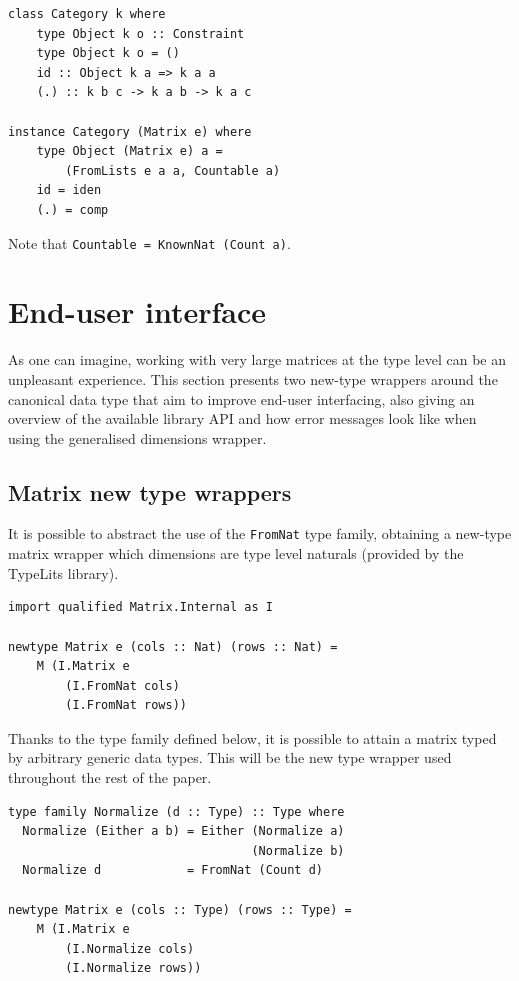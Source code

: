 \documentclass[sigplan]{acmart}\settopmatter{}
\newcommand{\hs}{\texttt}
\def\doc{paper}
\begin{document}
\vspace{1mm}
\begin{verbatim}
class Category k where
    type Object k o :: Constraint
    type Object k o = ()
    id :: Object k a => k a a
    (.) :: k b c -> k a b -> k a c
    
instance Category (Matrix e) where
    type Object (Matrix e) a =
        (FromLists e a a, Countable a)
    id = iden
    (.) = comp
\end{verbatim}
\vspace{1mm}
Note that \hs{Countable = KnownNat (Count a)}.

\section{End-user interface}\label{sec-manipulation}

As one can imagine, working with very large matrices at the type level can be an unpleasant experience. This section presents two new-type wrappers around the canonical data type that aim to improve end-user interfacing, also giving an overview of the available library API and how error messages look like when using the generalised dimensions wrapper.

\subsection{Matrix new type wrappers}\label{subsec-newtype-wrappers}

It is possible to abstract the use of the \hs{FromNat} type family, obtaining a new-type matrix wrapper which dimensions are type level naturals (provided by the TypeLits library). 

\vspace{1mm}
\begin{verbatim}
import qualified Matrix.Internal as I

newtype Matrix e (cols :: Nat) (rows :: Nat) = 
    M (I.Matrix e 
        (I.FromNat cols)
        (I.FromNat rows))
\end{verbatim}
\vspace{1mm}

Thanks to the type family defined below, it is possible to attain a matrix typed by arbitrary generic data types. This will be the new type wrapper used throughout the rest of the \doc.

\vspace{1mm}
\begin{verbatim}
type family Normalize (d :: Type) :: Type where
  Normalize (Either a b) = Either (Normalize a)
                                  (Normalize b)
  Normalize d            = FromNat (Count d)

newtype Matrix e (cols :: Type) (rows :: Type) = 
    M (I.Matrix e 
        (I.Normalize cols) 
        (I.Normalize rows)) 
\end{verbatim}
\vspace{1mm}
\end{document}
